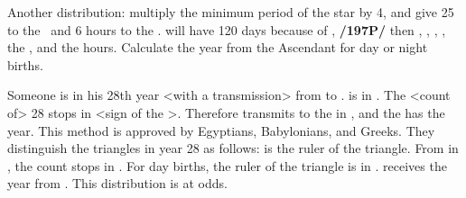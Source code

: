 Another distribution: multiply the minimum period of the star by 4, and give 25 to the \Moon\, and 6
hours to the \Sun. \Saturn\xspace will have 120 days because of \Capricorn, \textbf{/197P/} then \Mercury\xspace 80, \Venus\xspace 32, \Jupiter\xspace 48, \Mars\xspace 60, the \Moon\xspace 25, and the \Sun\xspace 6 hours. Calculate the year from the Ascendant for day or night births. 

Someone is in his 28th year <with a transmission> from \Libra\xspace to \Capricorn. \Saturn\xspace is in
\Libra. The <count of> 28 stops in \Leo <sign of the \Sun>. Therefore \Saturn\xspace transmits to the \Sun\xspace in \Libra, and the \Sun\xspace has the year. This method is approved by Egyptians, Babylonians, and Greeks. They distinguish the triangles in year 28 as follows: \Venus\xspace is the ruler of the triangle. From \Venus\xspace in \Cancer, the count stops in \Libra. For day births, the ruler of the triangle is \Saturn\xspace in \Libra. \Saturn\xspace receives the year from \Venus. This distribution is at odds.

\newpage
